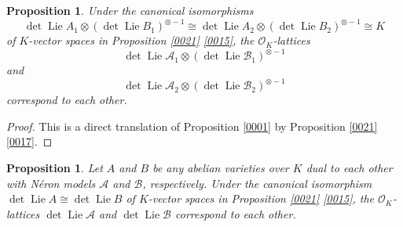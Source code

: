 \documentclass{amsart}
\newtheorem{proposition}[theorem]{Proposition}
\theoremstyle{remark}
\numberwithin{equation}{section}
\newcommand{\Order}{\mathcal{O}}
\newcommand{\tensor}{\mathbin{\otimes}}
\DeclareMathOperator{\Lie}{Lie}
\begin{document}
\begin{proposition} \label{0002}
	Under the canonical isomorphisms
		\[
				\det \Lie A_{1} \tensor (\det \Lie B_{1})^{\tensor -1}
			\cong
				\det \Lie A_{2} \tensor (\det \Lie B_{2})^{\tensor -1}
			\cong
				K
		\]
	of $K$-vector spaces in Proposition \ref{0021} \eqref{0015},
	the $\Order_{K}$-lattices
		\[
			\det \Lie \mathcal{A}_{1} \tensor (\det \Lie \mathcal{B}_{1})^{\tensor -1}
		\]
	and
		\[
			\det \Lie \mathcal{A}_{2} \tensor (\det \Lie \mathcal{B}_{2})^{\tensor -1}
		\]
	correspond to each other.
\end{proposition}

\begin{proof}
	This is a direct translation of
	Proposition \ref{0001}
	by Proposition \ref{0021} \eqref{0017}.
\end{proof}

\begin{proposition} \label{0003}
	Let $A$ and $B$ be any abelian varieties over $K$ dual to each other
	with N\'eron models $\mathcal{A}$ and $\mathcal{B}$, respectively.
	Under the canonical isomorphism
	$\det \Lie A \cong \det \Lie B$
	of $K$-vector spaces in Proposition \ref{0021} \eqref{0015},
	the $\Order_{K}$-lattices
	$\det \Lie \mathcal{A}$ and $\det \Lie \mathcal{B}$
	correspond to each other.
\end{proposition}
\end{document}
